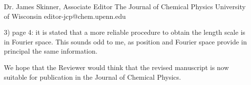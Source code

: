 \documentclass[a4paper, rebuttal, parskip=true, firsthead=false, fromemail=true, foldmarks=false]{scrlttr2}
\begin{document}
\begin{letter}{Dr. James Skinner, Associate Editor
The Journal of Chemical Physics
University of Wisconsin
editor-jcp@chem.upenn.edu }
\begin{quotationi}
3) page 4: it is stated that a more reliable procedure to obtain the
length scale is in Fourier space. This sounds odd to me, as position and
Fourier space provide in principal the same information.
\end{quotationi}

We hope that the Reviewer would think that the revised manuscript is now suitable for publication in the Journal of Chemical Physics.



\end{letter} 
\end{document}
